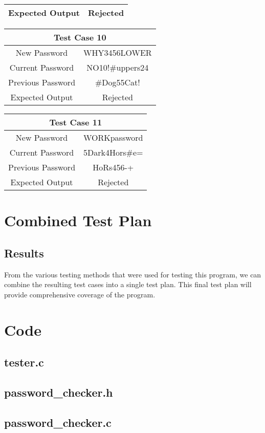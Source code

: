 \documentclass[12pt,letterpaper]{article}
\begin{document}
\begin{center}
\begin{tabular}{||c|c||}
  \hline
  Expected Output & Rejected \\
  \hline
  \end{tabular}
  \vspace{1mm}
  \begin{tabular}{||c|c||}
  \hline
  \multicolumn{2}{||c||}{Test Case 10} \\
  \hline
  New Password & WHY3456LOWER \\
  \hline
  Current Password & NO10!\#uppers24 \\
  \hline
  Previous Password & \#Dog55Cat! \\
  \hline
  Expected Output & Rejected \\
  \hline
  \end{tabular}
  \begin{tabular}{||c|c||}
  \hline
  \multicolumn{2}{||c||}{Test Case 11} \\
  \hline
  New Password & WORKpassword \\
  \hline
  Current Password & 5Dark4Hors\#e= \\
  \hline
  Previous Password & HoRs456-+ \\
  \hline
  Expected Output & Rejected \\
  \hline
  \end{tabular}

\end{center}



\section{Combined Test Plan}

\subsection{Results}

From the various testing methods that were used for testing this program,
we can combine the resulting test cases into a single test plan. This final
test plan will provide comprehensive coverage of the program.




\section{Code}

\subsection{tester.c}



\subsection{password\_checker.h}



\subsection{password\_checker.c}


\end{document}
